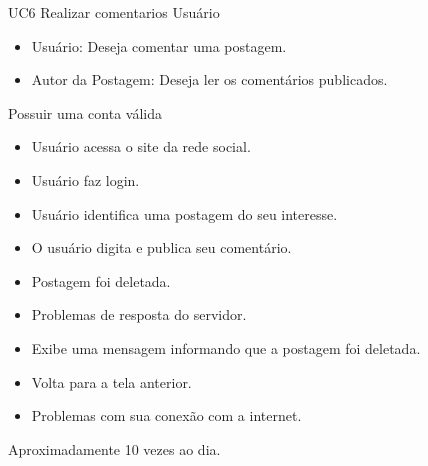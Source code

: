 \casoDeUso
{UC6}
{Realizar comentarios}
{Usuário}
{
\begin{itemize}
	\item Usuário: Deseja comentar uma postagem.
	\item Autor da Postagem: Deseja ler os comentários publicados.
\end{itemize}

}
{Possuir uma conta válida}
{}
{
\begin{itemize}
\item Usuário acessa o site da rede social.
\item Usuário faz login.
\item Usuário identifica uma postagem do seu interesse.
\item O usuário digita e publica seu comentário.
\end{itemize}
}
{
\begin{itemize}
\item Postagem foi deletada.
\item Problemas de resposta do servidor.
\item Exibe uma mensagem informando que a postagem foi deletada.
\item Volta para a tela anterior.
\item Problemas com sua conexão com a internet.
\end{itemize}
}
{Aproximadamente 10 vezes ao dia.}
{

}

